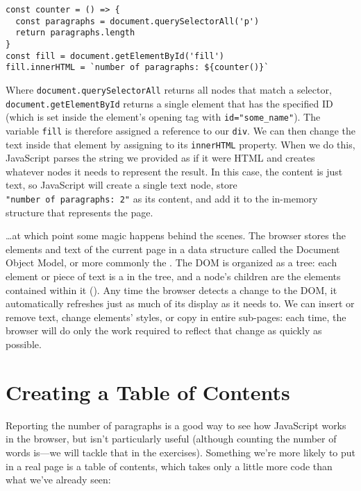\begin{verbatim}
const counter = () => {
  const paragraphs = document.querySelectorAll('p')
  return paragraphs.length
}
const fill = document.getElementById('fill')
fill.innerHTML = `number of paragraphs: ${counter()}`
\end{verbatim}

Where \texttt{document.querySelectorAll} returns all nodes that match a selector,
\texttt{document.getElementById} returns a single element that has the specified ID
(which is set inside the element's opening tag with \texttt{id="some\_name"}).
The variable \texttt{fill} is therefore assigned a reference to our \texttt{div}.
We can then change the text inside that element by assigning to its \texttt{innerHTML} property.
When we do this,
JavaScript parses the string we provided as if it were HTML
and creates whatever nodes it needs to represent the result.
In this case,
the content is just text,
so JavaScript will create a single text node,
store \texttt{"number\ of\ paragraphs:\ 2"} as its content,
and add it to the in-memory structure that represents the page.

{\ldots}at which point some magic happens behind the scenes.
The browser stores the elements and text of the current page in a data structure called
the Document Object Model,
or more commonly the .
The DOM is organized as a tree:
each element or piece of text is a  in the tree,
and a node's children are the elements contained within it ().
Any time the browser detects a change to the DOM,
it automatically refreshes just as much of its display as it needs to.
We can insert or remove text,
change elements' styles,
or copy in entire sub-pages:
each time,
the browser will do only the work required to reflect that change
as quickly as possible.


\section{Creating a Table of Contents}\label{s:pages-toc}

Reporting the number of paragraphs is a good way to see how JavaScript works in the browser,
but isn't particularly useful
(although counting the number of words is---we will tackle that in the exercises).
Something we're more likely to put in a real page is a table of contents,
which takes only a little more code than what we've already seen:

